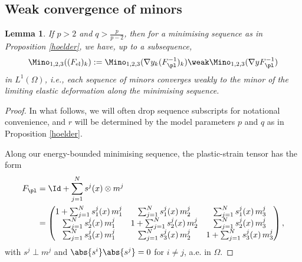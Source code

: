 \documentclass[11pt,reqno]{amsart}
\theoremstyle{plain}
\newtheorem{lemma}[theorem]{Lemma}
\theoremstyle{definition}
\theoremstyle{remark}
\begin{document}
\subsection{Weak convergence of minors}

\begin{lemma}\label{wk_minors}
If $p>2$ and $q>\frac{p}{p-2}$, then for a minimising sequence as in Proposition \ref{hoelder}, we have, up to a subsequence,
$$
\Mino_{1,2,3}((F_{\mathrm{el}})_k) := \Mino_{1,2,3}(\nabla y_k (F_\pl^{-1})_k) \weak \Mino_{1,2,3}(\nabla y F_\pl^{-1})
$$
in $L^1(\Omega)$, i.e., each sequence of minors converges weakly to the minor of the limiting elastic deformation along the minimising sequence.
\end{lemma}
\begin{proof} In what follows, we will often drop sequence subscripts for notational convenience, and $r$ will be determined by the model parameters $p$ and $q$ as in Proposition \ref{hoelder}.

Along our energy-bounded minimising sequence, the plastic-strain tensor has the form
\begin{align*}
F_\pl &= \Id + \sum_{j=1}^N s^j(x) \otimes m^j \\
&= \begin{pmatrix}
1 +  \sum_{j=1}^N s^j_1(x)\, m^j_1   & \sum_{j=1}^N s^j_1(x)\, m^j_2  & \sum_{j=1}^N s^j_1(x)\, m^j_3 \\
  \sum_{j=1}^N s^j_2(x)\, m^j_1   & 1 + \sum_{j=1}^N s^j_2(x)\, m^j_2  & \sum_{j=1}^N s^j_2(x)\, m^j_3 \\
  \sum_{j=1}^N s^j_3(x)\, m^j_1   & \sum_{j=1}^N s^j_3(x)\, m^j_2  & 1 +\sum_{j=1}^N s^j_3(x)\, m^j_3
\end{pmatrix},
\end{align*}
with $s^j \perp m^j$ and $\abs{s^i}\abs{s^j} = 0$ for $i\neq j$, a.e. in $\Omega$. 


\end{proof}
\end{document}
